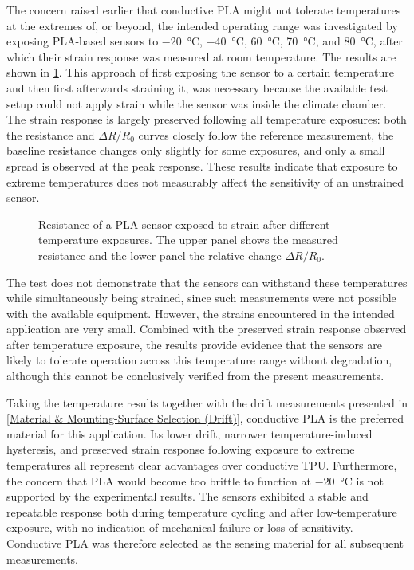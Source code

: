 The concern raised earlier that conductive PLA might not tolerate temperatures at the extremes of, or beyond, the intended operating range was investigated by exposing PLA-based sensors to \SI{-20}{\celsius}, \SI{-40}{\celsius}, \SI{60}{\celsius}, \SI{70}{\celsius}, and \SI{80}{\celsius}, after which their strain response was measured at room temperature. The results are shown in \cref{fig:PLA_after_temp_limits}. This approach of first exposing the sensor to a certain temperature and then first afterwards straining it, was necessary because the available test setup could not apply strain while the sensor was inside the climate chamber. The strain response is largely preserved following all temperature exposures: both the resistance and $\Delta R / R_0$ curves closely follow the reference measurement, the baseline resistance changes only slightly for some exposures, and only a small spread is observed at the peak response. These results indicate that exposure to extreme temperatures does not measurably affect the sensitivity of an unstrained sensor.

\begin{figure}[H]
\centering

    \caption{Resistance of a PLA sensor exposed to strain after different temperature exposures. The upper panel shows the measured resistance and the lower panel the relative change $\Delta R/R_0$.}
    \label{fig:temp_strain}
    \label{fig:PLA_after_temp_limits}
\end{figure}

The test does not demonstrate that the sensors can withstand these temperatures while simultaneously being strained, since such measurements were not possible with the available equipment. However, the strains encountered in the intended application are very small. Combined with the preserved strain response observed after temperature exposure, the results provide evidence that the sensors are likely to tolerate operation across this temperature range without degradation, although this cannot be conclusively verified from the present measurements.

Taking the temperature results together with the drift measurements presented in \cref{Material & Mounting-Surface Selection (Drift)}, conductive PLA is the preferred material for this application. Its lower drift, narrower temperature-induced hysteresis, and preserved strain response following exposure to extreme temperatures all represent clear advantages over conductive TPU. Furthermore, the concern that PLA would become too brittle to function at \SI{-20}{\celsius} is not supported by the experimental results. The sensors exhibited a stable and repeatable response both during temperature cycling and after low-temperature exposure, with no indication of mechanical failure or loss of sensitivity. Conductive PLA was therefore selected as the sensing material for all subsequent measurements.

